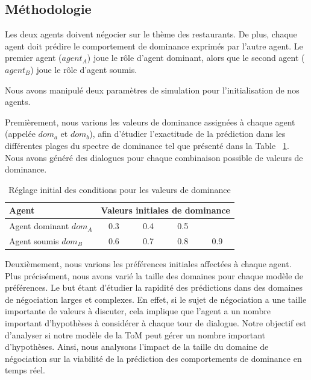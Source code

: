 \subsection{Méthodologie}

Les deux agents doivent négocier sur le thème des restaurants. De plus, chaque agent doit prédire le comportement de dominance exprimés par l'autre agent.
Le premier agent ($ agent_A $) joue le rôle d'agent dominant, alors que le second agent ($ agent_B $) joue le rôle d'agent soumis.

Nous avons manipulé deux paramètres de simulation pour l'initialisation de nos agents.

Premièrement, nous varions les valeurs de dominance assignées à chaque agent (appelée \emph {$dom_a$} et \emph {$dom_b$}), afin d'étudier l'exactitude de la prédiction dans les différentes plages du spectre de dominance tel que présenté dans la Table ~\ref {tab:domsettings}. Nous avons généré des dialogues pour chaque combinaison possible de valeurs de dominance.

\begin{table}[h]
	\centering
	\caption{Réglage initial des conditions pour les valeurs de dominance} 
	\begin{tabular}{|l|cccc|}
		\hline 
		\textbf{Agent} &	\multicolumn{4}{c|}{ \textbf{Valeurs initiales de dominance}} \\
		\hline
		Agent dominant $dom_A$ & 0.3 & 0.4 & 0.5 &  \\
		\hline
		Agent soumis $dom_B$ & 0.6 & 0.7 & 0.8 & 0.9\\
		\hline
	\end{tabular}
	
	\label{tab:domsettings}
\end{table}

Deuxièmement, nous varions les préférences initiales affectées à chaque agent. Plus précisément, nous avons varié la taille des domaines pour chaque modèle de préférences. Le but étant d'étudier la rapidité des prédictions dans des domaines de négociation larges et complexes. En effet, si le sujet de négociation a une taille importante de valeurs à discuter, cela implique que l'agent a un nombre important d'hypothèses à considérer à chaque tour de dialogue. Notre objectif est d'analyser si notre modèle de la ToM peut gérer un nombre important d'hypothèses. Ainsi, nous analysons  l'impact de la taille du domaine de négociation sur la viabilité de la prédiction des comportements de dominance en temps réel.

